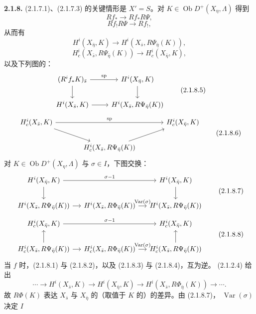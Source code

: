 \textbf{2.1.8.} (2.1.7.1)、(2.1.7.3) 的关键情形是 $X'=S$。对 $K\in\operatorname{Ob}D^+(X_\eta,\Lambda)$ 得到
\[Rf_*\longrightarrow Rf_*R\Psi,\tag{2.1.8.1}\]
\[Rf_!R\Psi\longrightarrow Rf_!,\tag{2.1.8.2}\]
从而有
\[H^i(X_{\bar\eta},K)\longrightarrow H^i(X_{\bar s},R\Psi_{\bar\eta}(K)),\tag{2.1.8.3}\]
\[H_c^i(X_{\bar s},R\Psi_{\bar\eta}(K))\longrightarrow H_c^i(X_{\bar\eta},K),\tag{2.1.8.4}\]
以及下列图的：
\[
\begin{tikzcd}
(R^if_*K)_{\bar s}\arrow[r,"\operatorname{sp}"]\arrow[d]&H^i(X_{\bar\eta},K)\arrow[d]\\
H^i(X_{\bar s},K)\arrow[r]&H^i(X_{\bar s},R\Psi_{\bar\eta}(K))
\end{tikzcd}\tag{2.1.8.5}
\]
\[
\begin{tikzcd}[column sep=large]
H_c^i(X_{\bar s},K)\arrow[rr,"\operatorname{sp}"]\arrow[dr]&&H_c^i(X_{\bar\eta},K)\\
&H_c^i(X_{\bar s},R\Psi_{\bar\eta}(K))\arrow[ur]&
\end{tikzcd}\tag{2.1.8.6}
\]
对 $K\in\operatorname{Ob}D^+(X_\eta,\Lambda)$ 与 $\sigma\in I$，下图交换：
\[
\begin{tikzcd}[column sep=small]
H^i(X_{\bar\eta},K)\arrow[rr,"\sigma-1"]\arrow[d]&&H^i(X_{\bar\eta},K)\arrow[d]\\
H^i(X_{\bar s},R\Psi_{\bar\eta}(K))\arrow[r]&H^i(X_{\bar s},R\Phi_{\bar\eta}(K))\arrow[r,"\operatorname{Var}(\sigma)"]&H^i(X_{\bar s},R\Psi_{\bar\eta}(K))
\end{tikzcd}\tag{2.1.8.7}
\]
\[
\begin{tikzcd}[column sep=small]
H_c^i(X_{\bar\eta},K)\arrow[rr,"\sigma-1"]&&H_c^i(X_{\bar\eta},K)\\
H_c^i(X_{\bar s},R\Psi_{\bar\eta}(K))\arrow[u]\arrow[r]&H_c^i(X_{\bar s},R\Phi_{\bar\eta}(K))\arrow[r,"\operatorname{Var}(\sigma)"]&H_c^i(X_{\bar s},R\Psi_{\bar\eta}(K))\arrow[u]
\end{tikzcd}\tag{2.1.8.8}
\]
当 $f$ 时，(2.1.8.1) 与 (2.1.8.2)，以及 (2.1.8.3) 与 (2.1.8.4)，互为逆。 (2.1.2.4) 给出
\[\cdots\longrightarrow H^i(X_{\bar s},K)\longrightarrow H^i(X_{\bar\eta},K)\longrightarrow H^i(X_{\bar s},R\Phi_{\bar\eta}(K))\longrightarrow\cdots.\tag{2.1.8.9}\]
故 $R\Phi(K)$ 表达 $X_{\bar s}$ 与 $X_{\bar\eta}$ 的（取值于 $K$ 的）的差异。由 (2.1.8.7)， $\operatorname{Var}(\sigma)$ 决定 $I$
